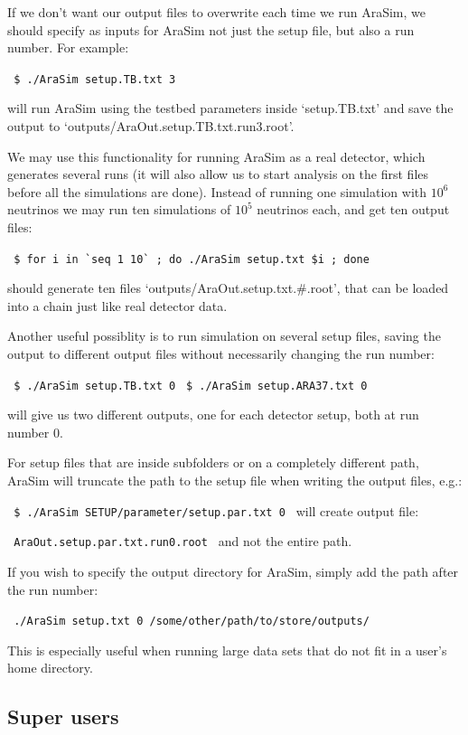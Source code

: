 \documentclass[a4paper,10pt]{article}
\newcommand{\room}{\vspace{0.3cm}}
\newcommand{\arasim}{AraSim\xspace}
\begin{document}
\room

If we don't want our output files to overwrite each time we run \arasim, we should specify as inputs for \arasim not just the setup file, but also a run number. For example:

\verb| $ ./AraSim setup.TB.txt 3 | 

will run \arasim using the testbed parameters inside `setup.TB.txt' and save the output to `outputs/AraOut.setup.TB.txt.run3.root'. 

We may use this functionality for running \arasim as a real detector, which generates several runs (it will also allow us to start analysis on the first files before all the simulations are done). Instead of running one simulation with $10^6$ neutrinos we may run ten simulations of $10^5$ neutrinos each, and get ten output files:

\verb| $ for i in `seq 1 10` ; do ./AraSim setup.txt $i ; done |

should generate ten files `outputs/AraOut.setup.txt.\#.root', that can be loaded into a chain just like real detector data. 

\room

Another useful possiblity is to run simulation on several setup files, saving the output to different output files without necessarily changing the run number:

\verb| $ ./AraSim setup.TB.txt 0|
\verb| $ ./AraSim setup.ARA37.txt 0|

will give us two different outputs, one for each detector setup, both at run number 0. 

For setup files that are inside subfolders or on a completely different path, AraSim will truncate the path to the setup file when writing the output files, e.g.:

\verb| $ ./AraSim SETUP/parameter/setup.par.txt 0 | will create output file: 

\verb| AraOut.setup.par.txt.run0.root | and not the entire path. 

\room

If you wish to specify the output directory for \arasim, simply add the path after the run number:

\verb| ./AraSim setup.txt 0 /some/other/path/to/store/outputs/ |

This is especially useful when running large data sets that do not fit in a user's home directory. 

\subsection{Super users}\label{super users}
\end{document}
